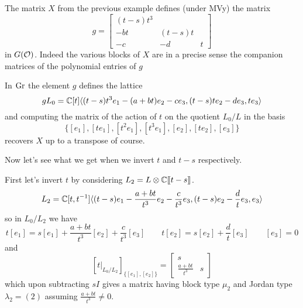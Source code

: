 \begin{example}
    The matrix $X$ from the previous example defines (under MVy) the matrix 
    \[
        g = \begin{bmatrix}
            (t-s)t^3 \\
            -bt & (t-s)t \\
            -c & -d & t 
        \end{bmatrix}
    \]
    in $G(\mathcal O)$. 
    Indeed the various blocks of $X$ are in a precise sense the companion matrices of the polynomial entries of $g$

    In $\operatorname{Gr}$ the element $g$ defines the lattice 
    \[
        gL_0 = \mathbb C[t]\langle
        (t-s)t^3e_1 - (a+bt) e_2 - ce_3 , (t-s)te_2 - de_3, te_3 
        \rangle
    \]
    and computing the matrix of the action of $t$ on the quotient $L_0/L$ in the basis 
    \[
    \{
        [e_1],[te_1],[t^2e_1],[t^3e_1],[e_2],[te_2],[e_3]
    \}    
    \]
    recovers $X$ up to a transpose of course. 

    Now let's see what we get when we invert $t$ and $t-s$ respectively. 

    First let's invert $t$ by considering $L_2 = L\otimes\mathbb C[\hspace{-.12em}[ {t-s} ]\hspace{-.12em}]$. 
    \[
        L_2  = \mathbb C[t,t^{-1}]\langle(t-s) e_1 -\frac{a+bt}{t^3} e_2 - \frac c {t^3} e_3, (t-s) e_2 - \frac d t e_3, e_3 \rangle
    \]
    so in $L_0/L_2$ we have 
    \[
    t[e_1] = s[e_1] + \frac{a+bt}{t^3} [e_2] + \frac c {t^3}  [e_3] \qquad t[e_2] = s[e_2] + \frac d t[e_3]    \qquad [e_3] = 0 
    \]
    and
    \[
    \left[t\big|_{L_0/L_2}\right]_{\{[e_1],[e_2]\}} = \begin{bmatrix}
        s \\
        \frac{a+bt}{t^3} & s 
    \end{bmatrix}
    \]
    which upon subtracting $s I$ gives a matrix having block type $\mu_2$ and Jordan type $\lambda_2 = (2)$ assuming $\frac{a+bt}{t^3}\ne 0$. 
    

\end{example}
